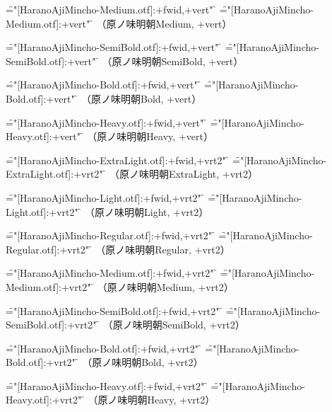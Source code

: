 \font\f="[HaranoAjiMincho-Medium.otf]:+fwid,+vert" \f
\testfwid
\font\f="[HaranoAjiMincho-Medium.otf]:+vert" \f
\test
（原ノ味明朝Medium, +vert）\par

\font\f="[HaranoAjiMincho-SemiBold.otf]:+fwid,+vert" \f
\testfwid
\font\f="[HaranoAjiMincho-SemiBold.otf]:+vert" \f
\test
（原ノ味明朝SemiBold, +vert）\par

\font\f="[HaranoAjiMincho-Bold.otf]:+fwid,+vert" \f
\testfwid
\font\f="[HaranoAjiMincho-Bold.otf]:+vert" \f
\test
（原ノ味明朝Bold, +vert）\par

\font\f="[HaranoAjiMincho-Heavy.otf]:+fwid,+vert" \f
\testfwid
\font\f="[HaranoAjiMincho-Heavy.otf]:+vert" \f
\test
（原ノ味明朝Heavy, +vert）\par


\font\f="[HaranoAjiMincho-ExtraLight.otf]:+fwid,+vrt2" \f
\testfwid
\font\f="[HaranoAjiMincho-ExtraLight.otf]:+vrt2" \f
\test
（原ノ味明朝ExtraLight, +vrt2）\par

\font\f="[HaranoAjiMincho-Light.otf]:+fwid,+vrt2" \f
\testfwid
\font\f="[HaranoAjiMincho-Light.otf]:+vrt2" \f
\test
（原ノ味明朝Light, +vrt2）\par

\font\f="[HaranoAjiMincho-Regular.otf]:+fwid,+vrt2" \f
\testfwid
\font\f="[HaranoAjiMincho-Regular.otf]:+vrt2" \f
\test
（原ノ味明朝Regular, +vrt2）\par

\font\f="[HaranoAjiMincho-Medium.otf]:+fwid,+vrt2" \f
\testfwid
\font\f="[HaranoAjiMincho-Medium.otf]:+vrt2" \f
\test
（原ノ味明朝Medium, +vrt2）\par

\font\f="[HaranoAjiMincho-SemiBold.otf]:+fwid,+vrt2" \f
\testfwid
\font\f="[HaranoAjiMincho-SemiBold.otf]:+vrt2" \f
\test
（原ノ味明朝SemiBold, +vrt2）\par

\font\f="[HaranoAjiMincho-Bold.otf]:+fwid,+vrt2" \f
\testfwid
\font\f="[HaranoAjiMincho-Bold.otf]:+vrt2" \f
\test
（原ノ味明朝Bold, +vrt2）\par

\font\f="[HaranoAjiMincho-Heavy.otf]:+fwid,+vrt2" \f
\testfwid
\font\f="[HaranoAjiMincho-Heavy.otf]:+vrt2" \f
\test
（原ノ味明朝Heavy, +vrt2）\par

\bye
